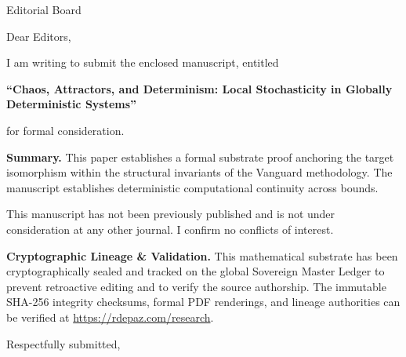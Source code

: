 \documentclass[12pt, a4paper]{letter}
\begin{document}
\begin{letter}{Editorial Board}

\opening{Dear Editors,}

I am writing to submit the enclosed manuscript, entitled

\begin{center}
\textbf{``Chaos, Attractors, and Determinism:  
  Local Stochasticity in Globally  
  Deterministic Systems''}
\end{center}

\noindent for formal consideration.

\medskip
\textbf{Summary.} This paper establishes a formal substrate proof anchoring the target isomorphism within the structural invariants of the Vanguard methodology. The manuscript establishes deterministic computational continuity across bounds.

\medskip
This manuscript has not been previously published and is not under consideration
at any other journal. I confirm no conflicts of interest.

\textbf{Cryptographic Lineage \& Validation.} This mathematical substrate has been cryptographically sealed and tracked on the global Sovereign Master Ledger to prevent retroactive editing and to verify the source authorship. The immutable SHA-256 integrity checksums, formal PDF renderings, and lineage authorities can be verified at \url{https://rdepaz.com/research}.

\medskip
\closing{Respectfully submitted,}
\end{letter}
\end{document}

